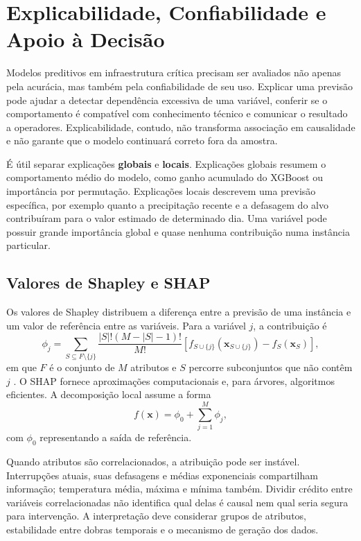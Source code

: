 \section{Explicabilidade, Confiabilidade e Apoio à Decisão}\label{sec:xai_confiabilidade}

Modelos preditivos em infraestrutura crítica precisam ser avaliados não apenas pela acurácia, mas também pela confiabilidade de seu uso. Explicar uma previsão pode ajudar a detectar dependência excessiva de uma variável, conferir se o comportamento é compatível com conhecimento técnico e comunicar o resultado a operadores. Explicabilidade, contudo, não transforma associação em causalidade e não garante que o modelo continuará correto fora da amostra.

É útil separar explicações \textbf{globais} e \textbf{locais}. Explicações globais resumem o comportamento médio do modelo, como ganho acumulado do XGBoost ou importância por permutação. Explicações locais descrevem uma previsão específica, por exemplo quanto a precipitação recente e a defasagem do alvo contribuíram para o valor estimado de determinado dia. Uma variável pode possuir grande importância global e quase nenhuma contribuição numa instância particular.

\subsection{Valores de Shapley e SHAP}

Os valores de Shapley distribuem a diferença entre a previsão de uma instância e um valor de referência entre as variáveis. Para a variável $j$, a contribuição é
\begin{equation}
\phi_j=
\sum_{S\subseteq F\setminus\{j\}}
\frac{|S|!(M-|S|-1)!}{M!}
\left[f_{S\cup\{j\}}(\mathbf{x}_{S\cup\{j\}})
-f_S(\mathbf{x}_S)\right],
\label{eq:shapley}
\end{equation}
em que $F$ é o conjunto de $M$ atributos e $S$ percorre subconjuntos que não contêm $j$ \cite{lundberg2017unified}. O SHAP fornece aproximações computacionais e, para árvores, algoritmos eficientes. A decomposição local assume a forma
\begin{equation}
    f(\mathbf{x})=\phi_0+\sum_{j=1}^{M}\phi_j,
\end{equation}
com $\phi_0$ representando a saída de referência.

Quando atributos são correlacionados, a atribuição pode ser instável. Interrupções atuais, suas defasagens e médias exponenciais compartilham informação; temperatura média, máxima e mínima também. Dividir crédito entre variáveis correlacionadas não identifica qual delas é causal nem qual seria segura para intervenção. A interpretação deve considerar grupos de atributos, estabilidade entre dobras temporais e o mecanismo de geração dos dados.

